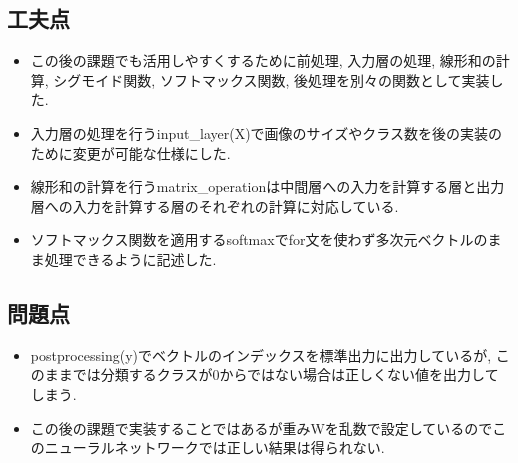 \documentclass[a4j]{jarticle}
\begin{document}
\subsection*{工夫点}
    \begin{itemize}
        \item  この後の課題でも活用しやすくするために前処理, 入力層の処理, 線形和の計算, シグモイド関数, ソフトマックス関数, 後処理を別々の関数として実装した.
        \item 入力層の処理を行うinput\_layer(X)で画像のサイズやクラス数を後の実装のために変更が可能な仕様にした.
        \item 線形和の計算を行うmatrix\_operationは中間層への入力を計算する層と出力層への入力を計算する層のそれぞれの計算に対応している.
        \item ソフトマックス関数を適用するsoftmaxでfor文を使わず多次元ベクトルのまま処理できるように記述した.
    \end{itemize}
\subsection*{問題点}
    \begin{itemize}
        \item  postprocessing(y)でベクトルのインデックスを標準出力に出力しているが, このままでは分類するクラスが0からではない場合は正しくない値を出力してしまう.
        \item この後の課題で実装することではあるが重みWを乱数で設定しているのでこのニューラルネットワークでは正しい結果は得られない. 
    \end{itemize}
\end{document}
